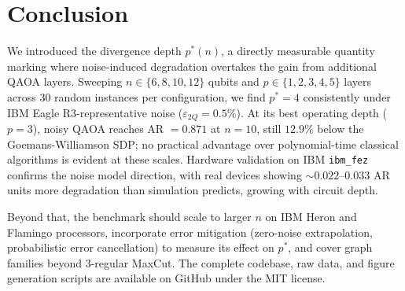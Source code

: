 \documentclass[12pt]{article}
\begin{document}
\section{Conclusion}

We introduced the divergence depth $p^*(n)$, a directly measurable quantity marking where noise-induced degradation overtakes the gain from additional QAOA layers. Sweeping $n \in \{6, 8, 10, 12\}$ qubits and $p \in \{1, 2, 3, 4, 5\}$ layers across 30 random instances per configuration, we find $p^* = 4$ consistently under IBM Eagle R3-representative noise ($\varepsilon_{2Q} = 0.5\%$). At its best operating depth ($p = 3$), noisy QAOA reaches AR $= 0.871$ at $n = 10$, still $12.9\%$ below the Goemans-Williamson SDP; no practical advantage over polynomial-time classical algorithms is evident at these scales. Hardware validation on IBM \texttt{ibm\_fez} confirms the noise model direction, with real devices showing $\sim 0.022$--$0.033$ AR units more degradation than simulation predicts, growing with circuit depth.

Beyond that, the benchmark should scale to larger $n$ on IBM Heron and Flamingo processors, incorporate error mitigation (zero-noise extrapolation, probabilistic error cancellation) to measure its effect on $p^*$, and cover graph families beyond 3-regular MaxCut. The complete codebase, raw data, and figure generation scripts are available on GitHub under the MIT license.



\end{document}
